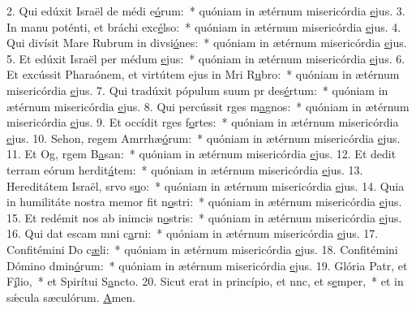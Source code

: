 2. Qui edúxit Israël de médi e\uline{ó}rum:~* quóniam in ætérnum misericórdia \uline{e}jus.
3. In manu poténti, et bráchi exc\uline{é}lso:~* quóniam in ætérnum misericórdia \uline{e}jus.
4. Qui divísit Mare Rubrum in divsi\uline{ó}nes:~* quóniam in ætérnum misericórdia \uline{e}jus.
5. Et edúxit Israël per médum \uline{e}jus:~* quóniam in ætérnum misericórdia \uline{e}jus.
6. Et excússit Pharaónem, et virtútem ejus in Mri R\uline{u}bro:~* quóniam in ætérnum misericórdia \uline{e}jus.
7. Qui tradúxit pópulum suum pr des\uline{é}rtum:~* quóniam in ætérnum misericórdia \uline{e}jus.
8. Qui percússit rges m\uline{a}gnos:~* quóniam in ætérnum misericórdia \uline{e}jus.
9. Et occídit rges f\uline{o}rtes:~* quóniam in ætérnum misericórdia \uline{e}jus.
10. Sehon, regem Amrrhæ\uline{ó}rum:~* quóniam in ætérnum misericórdia \uline{e}jus.
11. Et Og, rgem B\uline{a}san:~* quóniam in ætérnum misericórdia \uline{e}jus.
12. Et dedit terram eórum herdit\uline{á}tem:~* quóniam in ætérnum misericórdia \uline{e}jus.
13. Hereditátem Israël, srvo s\uline{u}o:~* quóniam in ætérnum misericórdia \uline{e}jus.
14. Quia in humilitáte nostra memor fit n\uline{o}stri:~* quóniam in ætérnum misericórdia \uline{e}jus.
15. Et redémit nos ab inimcis n\uline{o}stris:~* quóniam in ætérnum misericórdia \uline{e}jus.
16. Qui dat escam mni c\uline{a}rni:~* quóniam in ætérnum misericórdia \uline{e}jus.
17. Confitémini Do c\uline{æ}li:~* quóniam in ætérnum misericórdia \uline{e}jus.
18. Confitémini Dómino dmin\uline{ó}rum:~* quóniam in ætérnum misericórdia \uline{e}jus.
19. Glória Patr, et F\uline{í}lio,~* et Spirítui S\uline{a}ncto.
20. Sicut erat in princípio, et nnc, et s\uline{e}mper,~* et in sǽcula sæculórum. \uline{A}men.
